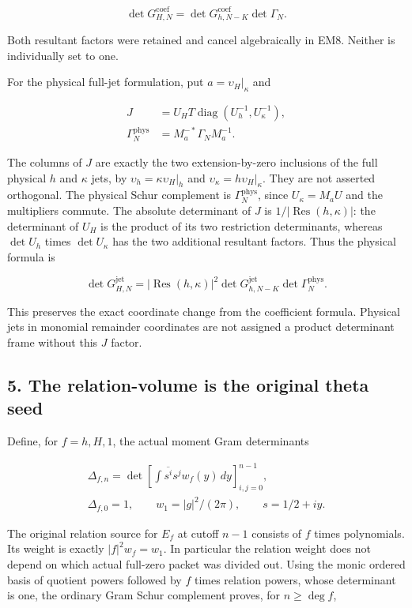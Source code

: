 \[
\det G_{H,N}^{\mathrm{coef}}=\det G_{h,N-K}^{\mathrm{coef}}\det\Gamma_N.\tag{EM8}
\]

Both resultant factors were retained and cancel algebraically in EM8.
Neither is individually set to one.

For the physical full-jet formulation, put \(a=\upsilon_H|_\kappa\) and

\[
\begin{aligned}J&=U_HT\operatorname{diag}(U_h^{-1},U_\kappa^{-1}),\\\Gamma_N^{\mathrm{phys}}&=M_a^{-*}\Gamma_NM_a^{-1}.\end{aligned}\tag{EM9}
\]

The columns of \(J\) are exactly the two extension-by-zero inclusions of
the full physical \(h\) and \(\kappa\) jets, by \(\upsilon_h=\kappa\upsilon_H|_h\)
and \(\upsilon_\kappa=h\upsilon_H|_\kappa\). They are not asserted orthogonal.
The physical Schur complement is \(\Gamma_N^{\mathrm{phys}}\), since
\(U_\kappa=M_aU\) and the multipliers commute. The absolute determinant
of \(J\) is \(1/|\operatorname{Res}(h,\kappa)|\): the determinant of \(U_H\) is the product of its
two restriction determinants, whereas \(\det U_h\) times \(\det U_\kappa\) has the
two additional resultant factors. Thus the physical formula is

\[
\det G_{H,N}^{\mathrm{jet}}=|\operatorname{Res}(h,\kappa)|^2\det G_{h,N-K}^{\mathrm{jet}}\det\Gamma_N^{\mathrm{phys}}.\tag{EM10}
\]

This preserves the exact coordinate change from the coefficient formula.
Physical jets in monomial remainder coordinates are not assigned a
product determinant frame without this \(J\) factor.

\subsection{5. The relation-volume is the original theta seed}\label{the-relation-volume-is-the-original-theta-seed}

Define, for \(f=h,H,1\), the actual moment Gram determinants

\[
\begin{gathered}\Delta_{f,n}=\det\left[\int\overline{s^i}s^jw_f(y)\,dy\right]_{i,j=0}^{n-1},\\\Delta_{f,0}=1,\qquad w_1=|g|^2/(2\pi),\qquad s=1/2+iy.\end{gathered}
\]

The original relation source for \(E_f\) at cutoff \(n-1\) consists of \(f\) times
polynomials. Its weight is exactly \(|f|^2w_f=w_1\). In particular the
relation weight does not depend on which actual full-zero packet was
divided out. Using the monic ordered basis of quotient powers followed
by \(f\) times relation powers, whose determinant is one, the ordinary Gram
Schur complement proves, for \(n\ge\deg f\),

